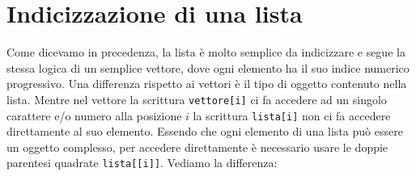 \documentclass[
]{book}
\newenvironment{Shaded}{\begin{snugshade}}{\end{snugshade}}
\newcommand{\CommentTok}[1]{\textcolor[rgb]{0.56,0.35,0.01}{\textit{#1}}}
\newcommand{\DataTypeTok}[1]{\textcolor[rgb]{0.13,0.29,0.53}{#1}}
\newcommand{\DecValTok}[1]{\textcolor[rgb]{0.00,0.00,0.81}{#1}}
\newcommand{\KeywordTok}[1]{\textcolor[rgb]{0.13,0.29,0.53}{\textbf{#1}}}
\newcommand{\NormalTok}[1]{#1}
\newcommand{\OperatorTok}[1]{\textcolor[rgb]{0.81,0.36,0.00}{\textbf{#1}}}
\newcommand{\StringTok}[1]{\textcolor[rgb]{0.31,0.60,0.02}{#1}}
\begin{document}
\hypertarget{indicizzazione-di-una-lista}{%
\section{Indicizzazione di una lista}\label{indicizzazione-di-una-lista}}

Come dicevamo in precedenza, la lista è molto semplice da indicizzare e segue la stessa logica di un semplice vettore, dove ogni elemento ha il suo indice numerico progressivo. Una differenza rispetto ai vettori è il tipo di oggetto contenuto nella lista. Mentre nel vettore la scrittura \texttt{vettore{[}i{]}} ci fa accedere ad un singolo carattere e/o numero alla posizione \(i\) la scrittura \texttt{lista{[}i{]}} non ci fa accedere direttamente al suo elemento. Essendo che ogni elemento di una lista può essere un oggetto complesso, per accedere direttamente è necessario usare le doppie parentesi quadrate \texttt{lista{[}{[}i{]}{]}}. Vediamo la differenza:

\begin{Shaded}
\end{Shaded}
\end{document}
